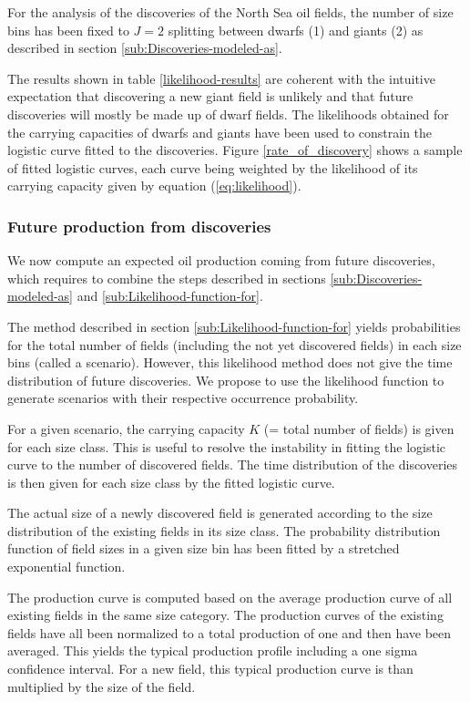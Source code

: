 \documentclass[review]{elsarticle}
\begin{document}
For the analysis of the discoveries of the North Sea oil fields, the number
of size bins has been fixed to $J=2$ splitting between dwarfs (1)
and giants (2) as described in section \ref{sub:Discoveries-modeled-as}.

The results shown in table \ref{likelihood-results} are coherent
with the intuitive expectation that discovering a new giant field
is unlikely and that future discoveries will mostly be made up of dwarf
fields. The likelihoods obtained for the carrying capacities of dwarfs
and giants have been used to constrain the logistic curve fitted to
the discoveries. Figure \ref{rate_of_discovery} shows a sample of
fitted logistic curves, each curve being weighted by the likelihood
of its carrying capacity given by equation (\ref{eq:likelihood}).


\subsubsection{Future production from discoveries\label{sub:Future-production-from}}

We now compute an expected oil production coming from future
discoveries, which requires to combine the steps described in sections
\ref{sub:Discoveries-modeled-as} and \ref{sub:Likelihood-function-for}.

The method described in section \ref{sub:Likelihood-function-for}
yields probabilities for the total number of fields (including the
not yet discovered fields) in each size bins (called a scenario).
However, this likelihood method does not give the time distribution
of future discoveries. We propose to use the likelihood function to
generate scenarios with their respective occurrence probability.

For a given scenario, the carrying capacity $K$ (= total number of
fields) is given for each size class. This is useful to resolve
the instability in fitting the logistic curve to the number of discovered
fields. The time distribution of the discoveries is then given for
each size class by the fitted logistic curve.

The actual size of a newly discovered field is generated according
to the size distribution of the existing fields in its size class.
The probability distribution function of field sizes in a given size
bin has been fitted by a stretched exponential function.

The production curve is computed based on the average production curve
of all existing fields in the same size category. The production curves
of the existing fields have all been normalized to a total production
of one and then have been averaged. This yields the typical production
profile including a one sigma confidence interval. For a new field,
this typical production curve is than multiplied by the size of the
field.
\end{document}
